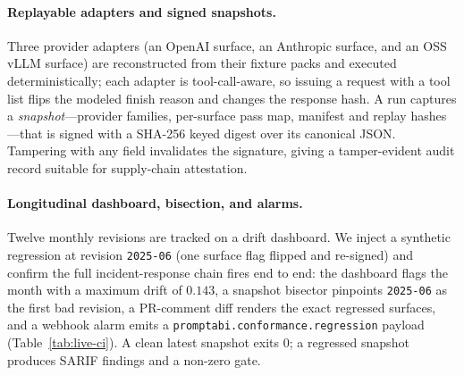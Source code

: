 \documentclass[10pt]{article}
\begin{document}
\paragraph{Replayable adapters and signed snapshots.}
Three provider adapters (an OpenAI surface, an Anthropic surface, and an
OSS vLLM surface) are reconstructed from their fixture packs and executed
deterministically; each adapter is tool-call-aware, so issuing a request with a
tool list flips the modeled finish reason and changes the response hash. A run
captures a \emph{snapshot}---provider families, per-surface pass map, manifest
and replay hashes---that is signed with a SHA-256 keyed digest over its canonical
JSON. Tampering with any field invalidates the signature, giving a tamper-evident
audit record suitable for supply-chain attestation.

\paragraph{Longitudinal dashboard, bisection, and alarms.}
Twelve monthly revisions are tracked on a drift dashboard. We inject a synthetic
regression at revision \texttt{2025-06} (one surface flag flipped and re-signed)
and confirm the full incident-response chain fires end to end: the dashboard
flags the month with a maximum drift of $0.143$, a snapshot bisector pinpoints
\texttt{2025-06} as the first bad revision, a PR-comment diff renders the exact
regressed surfaces, and a webhook alarm emits a
\texttt{promptabi.conformance.regression} payload (Table~\ref{tab:live-ci}). A
clean latest snapshot exits $0$; a regressed snapshot produces SARIF findings and
a non-zero gate.
\end{document}
